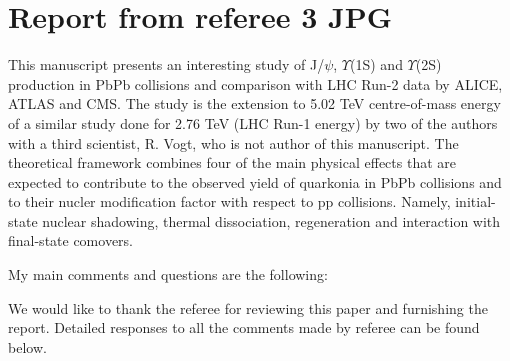 \documentclass[a4paper,11pt]{article}
\begin{document}
\selectfont


\section*{Report from referee 3 JPG}


This manuscript presents an interesting study of J/$\psi$, $\Upsilon$(1S) and $\Upsilon$(2S)
production in PbPb collisions and comparison with LHC Run-2 data by ALICE, ATLAS and CMS. 
The study is the extension to 5.02 TeV centre-of-mass energy of a similar study done for 2.76
TeV (LHC Run-1 energy) by two of the authors with a third scientist, R. Vogt, who is not author
of this manuscript. The theoretical framework combines four of the main physical effects that
are expected to contribute to the observed yield of quarkonia in PbPb collisions and to their
nucler modification factor with respect to pp collisions. Namely, initial-state nuclear shadowing,
thermal dissociation, regeneration and interaction with final-state comovers. 

My main comments and questions are the following:\newline




{\color{blue}
We would like to thank the referee for reviewing this paper and furnishing the report.
Detailed responses to all the comments made by referee can be found below.}
\end{document}
